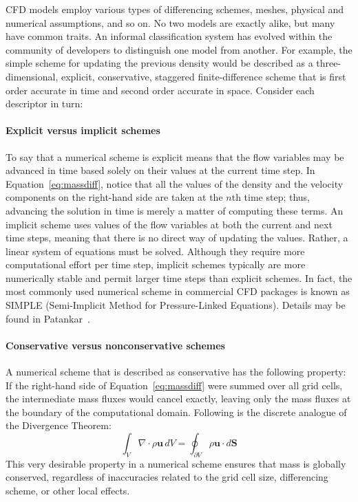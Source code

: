 \documentclass[graybox]{svmult}
\begin{document}
CFD models employ various types of differencing schemes, meshes, physical and numerical assumptions, and so on. No two models are exactly alike, but many have common traits. An informal classification system has evolved within the community of developers to distinguish one model from another. For example, the simple scheme for updating the previous density would be described as a three-dimensional, explicit, conservative, staggered finite-difference scheme that is first order accurate in time and second order accurate in space. Consider each descriptor in turn:

\paragraph{Explicit versus implicit schemes}

To say that a numerical scheme is explicit means that the flow variables may be advanced in time based solely on their values at the current time step. In Equation~\ref{eq:massdiff}, notice that all the values of the density and the velocity components on the right-hand side are taken at the $n$th time step; thus, advancing the solution in time is merely a matter of computing these terms. An implicit scheme uses values of the flow variables at both the current and next time steps, meaning that there is no direct way of updating the values. Rather, a linear system of equations must be solved. Although they require more computational effort per time step, implicit schemes typically are more numerically stable and permit larger time steps than explicit schemes. In fact, the most commonly used numerical scheme in commercial CFD packages is known as SIMPLE (Semi-Implicit Method for Pressure-Linked Equations). Details may be found in Patankar~\cite{Patankar}.

\paragraph{Conservative versus nonconservative schemes}

A numerical scheme that is described as conservative has the following property: If the right-hand side of Equation~\ref{eq:massdiff} were summed over all grid cells, the intermediate mass fluxes would cancel exactly, leaving only the mass fluxes at the boundary of the computational domain. Following is the discrete analogue of the Divergence Theorem:
\begin{equation}
\int_V \nabla \cdot \rho \mathbf{u} \, dV = \oint_{\partial V} \rho \mathbf{u} \cdot d\mathbf{S}
\label{eq:divtheorem}
\end{equation}
This very desirable property in a numerical scheme ensures that mass is globally conserved, regardless of inaccuracies related to the grid cell size, differencing scheme, or other local effects.
\end{document}
